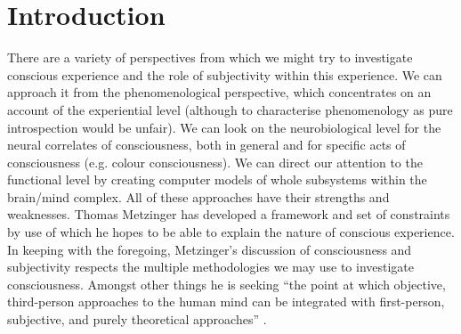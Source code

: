 
\chapter{Introduction}
\label{chap:intro}

There are a variety of perspectives from which we might try to investigate conscious experience and the role of subjectivity within this experience. We can approach it from the phenomenological perspective, which concentrates on an account of the experiential level (although to characterise phenomenology as pure introspection would be unfair). We can look on the neurobiological level for the neural correlates of consciousness, both in general and for specific acts of consciousness (e.g. colour consciousness). We can direct our attention to the functional level by creating computer models of whole subsystems within the brain/mind complex. All of these approaches have their strengths and weaknesses. Thomas Metzinger has developed a framework and set of constraints by use of which he hopes to be able to explain the nature of conscious experience. In keeping with the foregoing, Metzinger’s discussion of consciousness and subjectivity respects the multiple methodologies we may use to investigate consciousness. Amongst other things he is seeking “the point at which objective, third-person approaches to the human mind can be integrated with first-person, subjective, and purely theoretical approaches” \cite{metzinger2003}.


